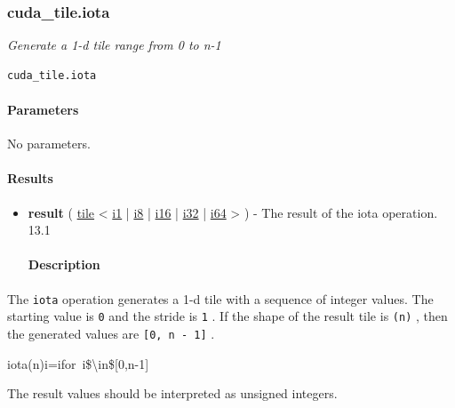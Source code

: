 \documentclass{article}
\begin{document}
\subsubsection{cuda\_tile.iota}

\textit{Generate a 1-d tile range from 0 to n-1}


\begin{lstlisting}
cuda_tile.iota
\end{lstlisting}

\paragraph{Parameters}

No parameters.



\paragraph{Results}

\begin{itemize}
\item \textbf{result} ( \href{https://docs.nvidia.com/cuda/tile-ir/latest/sections/types.html#type-tile}{tile} < \href{https://docs.nvidia.com/cuda/tile-ir/latest/sections/types.html#subsection-element-types}{i1} | \href{https://docs.nvidia.com/cuda/tile-ir/latest/sections/types.html#subsection-element-types}{i8} | \href{https://docs.nvidia.com/cuda/tile-ir/latest/sections/types.html#subsection-element-types}{i16} | \href{https://docs.nvidia.com/cuda/tile-ir/latest/sections/types.html#subsection-element-types}{i32} | \href{https://docs.nvidia.com/cuda/tile-ir/latest/sections/types.html#subsection-element-types}{i64} > ) - The result of the iota operation. 13.1


\paragraph{Description}

\end{itemize}
The \texttt{iota} operation generates a 1-d tile with a sequence of integer values. The starting value is \texttt{0} and the stride is \texttt{1} . If the shape of the result tile is \texttt{(n)} , then the generated values are \texttt{[0, n - 1]} .


iota(n)i=ifor i\$\textbackslash{}in\$[0,n-1]

The result values should be interpreted as unsigned integers.
\end{document}
